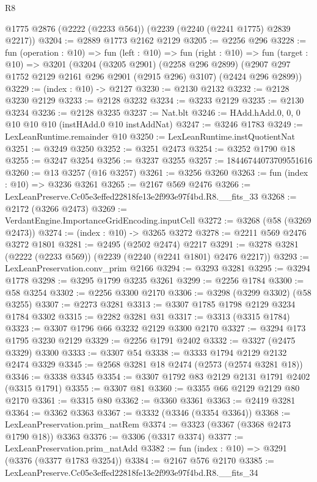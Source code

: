 \begin{lexlean}{R8}
\begin{coremodule}
    @1775
    @2876
    (@2222 (@2233 @564))
    (@2239 (@2240 (@2241 @1775) @2839 @2217))
@3204 := @2889 @1773 @2162 @2129
@3205 := @2256 @296
@3228 := fun (operation : @10) =>
  fun (left : @10) =>
  fun (right : @10) =>
  fun (target : @10) =>
  @3201
    (@3204
      (@3205 @2901)
      (@2258 @296 @2899)
      (@2907 @297 @1752 @2129 @2161 @296 @2901 (@2915 @296) @3107)
      (@2424 @296 @2899))
@3229 := (index : @10) -> @2127
@3230 := @2130 @2132
@3232 := @2128 @3230 @2129
@3233 := @2128 @3232
@3234 := @3233 @2129
@3235 := @2130 @3234
@3236 := @2128 @3235
@3237 := Nat.blt
@3246 := HAdd.hAdd.{0, 0, 0} @10 @10 @10 (instHAdd.{0} @10 instAddNat)
@3247 := @3246 @1783
@3249 := LexLeanRuntime.remainder @10
@3250 := LexLeanRuntime.instQuotientNat
@3251 := @3249 @3250
@3252 := @3251 @2473
@3254 := @3252 @1790 @18
@3255 := @3247 @3254
@3256 := @3237 @3255
@3257 := 18446744073709551616
@3260 := @13 @3257 (@16 @3257)
@3261 := @3256 @3260
@3263 := fun (index : @10) => @3236 @3261
@3265 := @2167 @569 @2476
@3266 := LexLeanPreserve.Cc05e3effed22818fe13e2f993e97f4bd.R8.__fits_33
@3268 := @2172 (@3266 @2473)
@3269 := VerdantEngine.ImportanceGridEncoding.inputCell
@3272 := @3268 (@58 (@3269 @2473))
@3274 := (index : @10) -> @3265 @3272
@3278 := @2211 @569 @2476 @3272 @1801
@3281 := @2495 (@2502 @2474) @2217
@3291 := @3278 @3281 (@2222 (@2233 @569)) (@2239 (@2240 (@2241 @1801) @2476 @2217))
@3293 := LexLeanPreservation.conv_prim @2166
@3294 := @3293 @3281
@3295 := @3294 @1778
@3298 := @3295 @1799 @3235 @3261
@3299 := @2256 @1784
@3300 := @58 @3254
@3302 := @2256 @3300 @2170
@3306 := @3298 (@3299 @3302) (@58 @3255)
@3307 := @2273 @3281
@3313 := @3307 @1785 @1798 @2129 @3234 @1784 @3302
@3315 := @2282 @3281 @31
@3317 := @3313 (@3315 @1784)
@3323 := @3307 @1796 @66 @3232 @2129 @3300 @2170
@3327 := @3294 @173 @1795 @3230 @2129
@3329 := @2256 @1791 @2402
@3332 := @3327 (@2475 @3329) @3300
@3333 := @3307 @54
@3338 := @3333 @1794 @2129 @2132 @2474 @3329
@3345 := @2568 @3281 @18 @2474 (@2573 (@2574 @3281 @18))
@3346 := @3338 @3345
@3354 := @3307 @1792 @83 @2129 @2131 @1791 @2402 (@3315 @1791)
@3355 := @3307 @81
@3360 := @3355 @66 @2129 @2129 @80 @2170
@3361 := @3315 @80
@3362 := @3360 @3361
@3363 := @2419 @3281
@3364 := @3362 @3363
@3367 := @3332 (@3346 (@3354 @3364))
@3368 := LexLeanPreservation.prim_natRem
@3374 := @3323 (@3367 (@3368 @2473 @1790 @18)) @3363
@3376 := @3306 (@3317 @3374)
@3377 := LexLeanPreservation.prim_natAdd
@3382 := fun (index : @10) => @3291 (@3376 (@3377 @1783 @3254))
@3384 := @2167 @576 @2170
@3385 := LexLeanPreserve.Cc05e3effed22818fe13e2f993e97f4bd.R8.__fits_34

\end{coremodule}
\end{lexlean}
